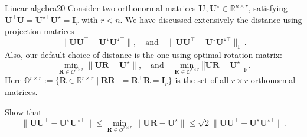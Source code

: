 \documentclass{article}
\begin{document}
\begin{problem}{Linear algebra}{20}
Consider two orthonormal matrices $\bm{U},\bm{U}^{\star} \in\mathbb{R}^{n\times r}$,
	satisfying $\bm{U}^{\top}\bm{U}= \bm{U}^{\star\top} \bm{U}^{\star}=\bm{I}_r$ with $r<n$. We have discussed extensively the distance using projection matrices
\[
\|\bm{U}\bm{U}^{\top} - \bm{U}^{\star}\bm{U}^{\star\top} \|, \quad \text{and}\quad \|\bm{U}\bm{U}^{\top} - \bm{U}^{\star}\bm{U}^{\star\top} \|_{\mathrm{F}}.
\]
Also, our default choice of distance is the one using optimal rotation matrix: 
\[
\min_{\bm{R}\in \mathcal{O}^{r\times r}}\big\|\bm{U}\bm{R}-\bm{U}^{\star}\big\| , \quad \text{and}\quad \min_{\bm{R}\in\mathcal{O}^{r\times r}}\left\Vert \bm{U}\bm{R}-\bm{U}^{\star}\right\Vert _{\mathrm{F}}.
\]
Here $\mathbb{O}^{r\times r}:=\{\bm{R}\in\mathbb{R}^{r\times r}\mid\bm{R}\bm{R}^{\top}=\bm{R}^{\top}\bm{R}=\bm{I}_{r}\}$ is the set of all $r\times r$ orthonormal matrices. 


	 Show that 
	\[
	\|\bm{U}\bm{U}^{\top} - \bm{U}^{\star}\bm{U}^{\star\top} \|
	\leq
	\min_{\bm{R}\in \mathcal{O}^{r\times r}}\big\|\bm{U}\bm{R}-\bm{U}^{\star}\big\|
	\leq \sqrt{2} \|\bm{U}\bm{U}^{\top} - \bm{U}^{\star}\bm{U}^{\star\top} \|.
	\]


\end{problem}
\end{document}
